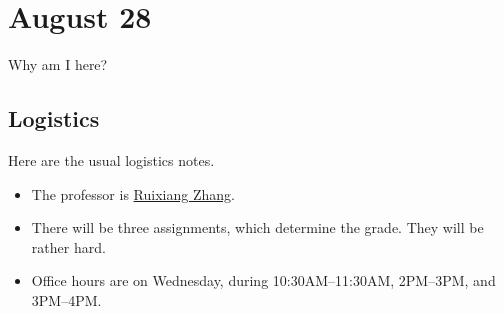 \documentclass[../notes.tex]{subfiles}
\begin{document}
\section{August 28}

Why am I here?

\subsection{Logistics}
Here are the usual logistics notes.
\begin{itemize}
	\item The professor is \href{mailto:ruixiang@berkeley.edu}{Ruixiang Zhang}.
	\item There will be three assignments, which determine the grade. They will be rather hard.
	\item Office hours are on Wednesday, during 10:30AM--11:30AM, 2PM--3PM, and 3PM--4PM.
\end{itemize}
\end{document}
